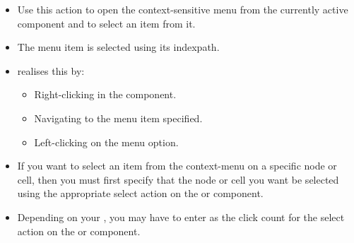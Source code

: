\begin{itemize}
\item Use this action to open the context-sensitive menu from the currently active component and to select an item from it.
\item The menu item is selected using its indexpath. 
\item \jb{} realises this by:
\begin{itemize}
\item Right-clicking in the component.
\item Navigating to the menu item specified.
\item Left-clicking on the menu option.  
\end{itemize}
\item If you want to select an item from the context-menu on a specific node or cell, then you must first specify that the node or cell you want be selected using the appropriate select action on the  or  component. 
\item Depending on your \gdaut{}, you may have to enter  as the click count for the select action on the  or  component.

\end{itemize}

  
